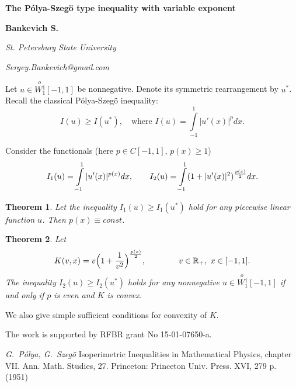 \documentclass[12pt]{article}
\newtheorem{thm}{Theorem}
\newcommand{\Wf}{\stackrel{o\ }{W{}_1^1}}
\newcommand{\Real}{\mathbb R}
\renewcommand{\ge}{\geqslant}
\begin{document}
\centerline{\large\bf The P\'olya-Szeg\"o type inequality with variable exponent}
\medskip
\centerline{\bf Bankevich S.}
\medskip
\centerline{\it St. Petersburg State University}
\centerline{\it Sergey.Bankevich@gmail.com}
\bigskip

Let $u \in \Wf[-1,1]$ be nonnegative.
Denote its symmetric rearrangement by $u^*$.
Recall the classical P\'olya-Szeg\"o \cite{PS} inequality:
\begin{equation}
\label{ineq}
I(u) \ge I(u^*), \quad \mbox{where } I(u) = \int\limits_{-1}^1 |u'(x)|^p dx.
\end{equation}

Consider the functionals (here $p \in C[-1, 1]$, $p(x) \ge 1$)
\begin{equation}
I_1(u) = \int\limits_{-1}^1 |u'(x)|^{p(x)} dx, \qquad
I_2(u) = \int\limits_{-1}^1 ( 1 + |u'(x)|^2 )^{p(x) \over 2} dx.
\end{equation}

\begin{thm}
Let the inequality $I_1(u) \ge I_1(u^*)$ hold for any piecewise linear function $u$.
Then $p(x) \equiv const$.
\end{thm}

\begin{thm}
Let
$$K(v, x) = v \Big(1 + {1 \over v^2}\Big)^{p(x) \over 2}, \qquad \qquad v \in \Real_+,\ x \in [-1, 1].$$
The inequality $I_2(u) \ge I_2(u^*)$ holds for any nonnegative $u \in \Wf[-1, 1]$ if and only if
$p$ is even and $K$ is convex.
\end{thm}

We also give simple sufficient conditions for convexity of $K$.

The work is supported by RFBR grant No 15-01-07650-a.

\begin{thebibliography}{100}
 {\it G.~P\'olya, G.~Szeg\"o}
Isoperimetric Inequalities in Mathematical Physics, chapter VII.
Ann. Math. Studies, 27. Princeton: Princeton Univ. Press. XVI, 279 p. (1951)
\end{thebibliography}
\end{document}
